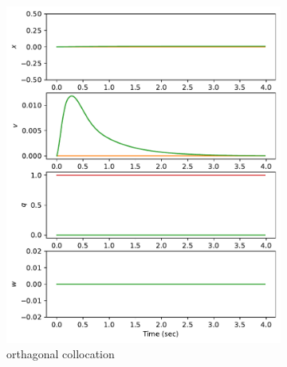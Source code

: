 \documentclass[]{article}
\begin{document}
\begin{figure}[H]
	\centering
	\begin{subfigure}[b]{0.3\textwidth}
		\centering
		\includegraphics[width=\textwidth]{figures/statehover1.pdf}
		\caption{orthagonal collocation}
	\end{subfigure}%
	\begin{subfigure}[b]{0.3\textwidth}
		\centering

\end{subfigure}
\end{figure}
\end{document}
